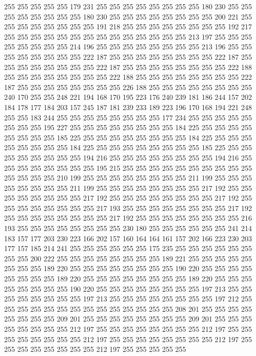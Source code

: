 255 255 255 255 255 179 231 255 255 255 255 255 255 255 255 180 230 255 255 255
255 255 255 255 255 180 230 255 255 255 255 255 255 255 255 200 221 255 255 255
255 255 255 255 255 191 218 255 255 255 255 255 255 255 255 192 217 255 255 255
255 255 255 255 255 255 255 255 255 255 255 213 197 255 255 255 255 255 255 255
255 214 196 255 255 255 255 255 255 255 255 213 196 255 255 255 255 255 255 255
255 222 187 255 255 255 255 255 255 255 255 222 187 255 255 255 255 255 255 255
255 222 187 255 255 255 255 255 255 255 255 222 188 255 255 255 255 255 255 255
255 222 188 255 255 255 255 255 255 255 255 222 187 255 255 255 255 255 255 255
255 226 188 255 255 255 255 255 255 255 255 240 170 255 255 248 221 194 168 170
195 223 176 240 239 181 186 244 157 202 184 178 177 184 203 157 245 187 181 239
233 189 223 196 170 168 194 221 248 255 255 183 244 255 255 255 255 255 255 255
255 177 234 255 255 255 255 255 255 255 255 195 227 255 255 255 255 255 255 255
255 184 225 255 255 255 255 255 255 255 255 185 225 255 255 255 255 255 255 255
255 184 225 255 255 255 255 255 255 255 255 184 225 255 255 255 255 255 255 255
255 185 225 255 255 255 255 255 255 255 255 194 216 255 255 255 255 255 255 255
255 194 216 255 255 255 255 255 255 255 255 195 215 255 255 255 255 255 255 255
255 255 255 255 255 255 255 210 199 255 255 255 255 255 255 255 255 211 199 255
255 255 255 255 255 255 255 211 199 255 255 255 255 255 255 255 255 217 192 255
255 255 255 255 255 255 255 217 192 255 255 255 255 255 255 255 255 217 192 255
255 255 255 255 255 255 255 217 193 255 255 255 255 255 255 255 255 217 192 255
255 255 255 255 255 255 255 217 192 255 255 255 255 255 255 255 255 216 193 255
255 255 255 255 255 255 255 230 180 255 255 255 255 255 255 241 214 183 157 177
203 230 223 166 202 157 160 164 164 161 157 202 166 223 230 203 177 157 185 214
241 255 255 255 255 255 255 175 235 255 255 255 255 255 255 255 255 200 222 255
255 255 255 255 255 255 255 189 221 255 255 255 255 255 255 255 255 189 220 255
255 255 255 255 255 255 255 190 220 255 255 255 255 255 255 255 255 189 220 255
255 255 255 255 255 255 255 189 220 255 255 255 255 255 255 255 255 190 220 255
255 255 255 255 255 255 255 197 213 255 255 255 255 255 255 255 255 197 213 255
255 255 255 255 255 255 255 197 212 255 255 255 255 255 255 255 255 255 255 255
255 255 255 208 201 255 255 255 255 255 255 255 255 209 201 255 255 255 255 255
255 255 255 209 201 255 255 255 255 255 255 255 255 212 197 255 255 255 255 255
255 255 255 212 197 255 255 255 255 255 255 255 255 212 197 255 255 255 255 255
255 255 255 212 197 255 255 255 255 255 255 255 255 212 197 255 255 255 255 255
